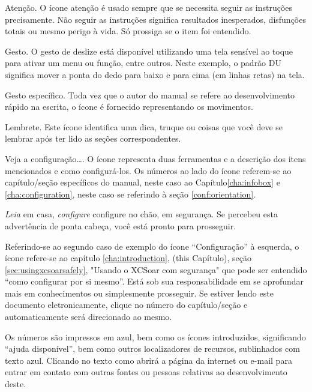 \warning Atenção.  O ícone atenção é usado sempre que se necessita seguir as instruções precisamente.   Não seguir as instruções significa resultados inesperados, disfunções totais ou mesmo perigo à vida.  Só prossiga se o item foi entendido.

 Gesto.  O gesto de deslize está disponível utilizando uma tela sensível ao toque para ativar um menu ou função, entre outros.  Neste exemplo, o padrão DU significa mover a ponta do dedo para baixo e para cima (em linhas retas) na tela.
  
 Gesto específico.  Toda vez que o autor do manual se refere ao desenvolvimento rápido na escrita, o ícone é fornecido representando os movimentos.

\tip Lembrete. Este ícone identifica uma dica, truque ou coisas que você deve se lembrar após ter lido as seções correspondentes.

 Veja a configuração…. O ícone representa duas ferramentas e a descrição dos itens mencionados e como configurá-los.  Os números ao lado do ícone referem-se ao capítulo/seção específicos do manual, neste caso ao Capítulo\ref{cha:infobox} e \ref{cha:configuration}, neste caso se referindo à seção \ref{conf:orientation}. 


\emph{Leia} em casa, \emph{configure} configure no chão, em segurança.  Se percebeu esta advertência de ponta cabeça, você está pronto para prosseguir.

 Referindo-se ao segundo caso de exemplo do ícone “Configuração” à esquerda, o ícone refere-se ao capítulo \ref{cha:introduction}, (this Capítulo), seção 
\ref{sec:usingxcsoarsafely}, "Usando o XCSoar com segurança" que pode ser entendido “como configurar por si mesmo”.  Está sob sua responsabilidade em se aprofundar mais em conhecimentos ou simplesmente prosseguir.  Se estiver lendo este documento eletronicamente, clique no número do capítulo/seção e automaticamente será direcionado ao mesmo.  

Os números são impressos em azul, bem como os ícones introduzidos, significando “ajuda disponível”, bem como outros localizadores de recursos, sublinhados com texto azul. Clicando no texto como   abrirá a página da internet ou e-mail para entrar em contato com outras fontes ou pessoas relativas ao desenvolvimento deste.

